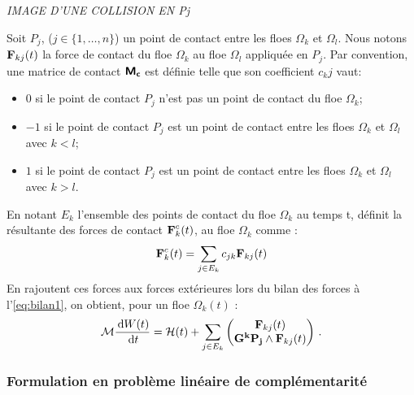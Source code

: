 \textit{IMAGE D'UNE COLLISION EN Pj}

Soit $P_j$, ($j \in \{1,\ldots,n\}$) un point de contact entre les floes $\Omega_k$ et $\Omega_l$. Nous notons $\bm{\mathrm{F}}_{kj}(t)$ la force de contact du floe $\Omega_k$ au floe $\Omega_l$ appliquée en $P_j$. Par convention, une matrice de contact $\bm{\mathsf{M_c}}$ est définie telle que son coefficient $c_kj$ vaut:
\begin{itemize}
    \item $0$ si le point de contact $P_j$ n’est pas un point de contact du floe $\Omega_k$;
    \item $-1$ si le point de contact $P_j$ est un point de contact entre les floes $\Omega_k$ et $\Omega_l$ avec $k < l$;
    \item $1$ si le point de contact $P_j$ est un point de contact entre les floes $\Omega_k$ et $\Omega_l$ avec $k > l$.
\end{itemize}
En notant $E_k$ l’ensemble des points de contact du floe $\Omega_k$ au temps t, \parencite[p.26]{rabatel2015thesis} définit la résultante des forces de contact $\bm{\mathrm{F}}^c_k(t)$, au floe $\Omega_k$ comme :
$$
\bm{\mathrm{F}}^c_k(t) = \sum_{j \in E_k} c_{jk} \bm{\mathrm{F}}_{kj}(t) 
$$
En rajoutent ces forces aux forces extérieures lors du bilan des forces à l'\cref{eq:bilan1}, on obtient, pour un floe $\Omega_k(t)$ :
\begin{align} \label{eq:bilan1}
    \mathcal{M} \frac{\diff W(t)}{\diff t} = \mathcal{H}(t) + \sum_{j \in E_k} \begin{pmatrix}
        \bvec{F}_{kj}(t) \\ \bvec{G^kP_j} \wedge \bvec{F}_{kj}(t) 
    \end{pmatrix} \,.
\end{align}


\subsubsection{Formulation en problème linéaire de complémentarité}

